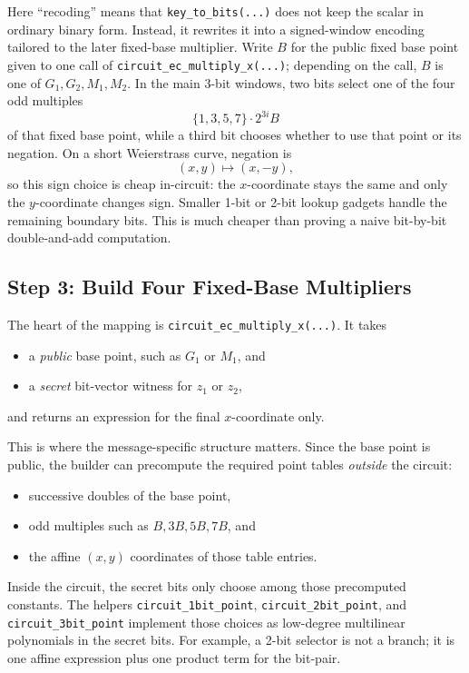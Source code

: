 \documentclass[11pt]{article}
\begin{document}
Here ``recoding'' means that \texttt{key\_to\_bits(...)} does not keep the scalar in ordinary
binary form. Instead, it rewrites it into a signed-window encoding tailored to the later
fixed-base multiplier. Write $B$ for the public fixed base point given to one call of
\texttt{circuit\_ec\_multiply\_x(...)}; depending on the call, $B$ is one of
$G_1,G_2,M_1,M_2$. In the main 3-bit windows, two bits select one of the four odd multiples
\[
\{1,3,5,7\}\cdot 2^{3i}B
\]
of that fixed base point, while a third bit chooses whether to use that point or its negation. On
a short Weierstrass curve, negation is
\[
(x,y) \mapsto (x,-y),
\]
so this sign choice is cheap in-circuit: the $x$-coordinate stays the same and only the
$y$-coordinate changes sign. Smaller 1-bit or 2-bit lookup gadgets handle the remaining boundary
bits. This is much cheaper than proving a naive bit-by-bit double-and-add computation.

\subsection{Step 3: Build Four Fixed-Base Multipliers}

The heart of the mapping is \texttt{circuit\_ec\_multiply\_x(...)}. It takes
\begin{itemize}[nosep]
  \item a \emph{public} base point, such as $G_1$ or $M_1$, and
  \item a \emph{secret} bit-vector witness for $z_1$ or $z_2$,
\end{itemize}
and returns an expression for the final $x$-coordinate only.

This is where the message-specific structure matters. Since the base point is public, the builder
can precompute the required point tables \emph{outside} the circuit:
\begin{itemize}[nosep]
  \item successive doubles of the base point,
  \item odd multiples such as $B,3B,5B,7B$, and
  \item the affine $(x,y)$ coordinates of those table entries.
\end{itemize}

Inside the circuit, the secret bits only choose among those precomputed constants. The helpers
\texttt{circuit\_1bit\_point}, \texttt{circuit\_2bit\_point}, and
\texttt{circuit\_3bit\_point} implement those choices as low-degree multilinear polynomials in the
secret bits. For example, a 2-bit selector is not a branch; it is one affine expression plus one
product term for the bit-pair.
\end{document}
